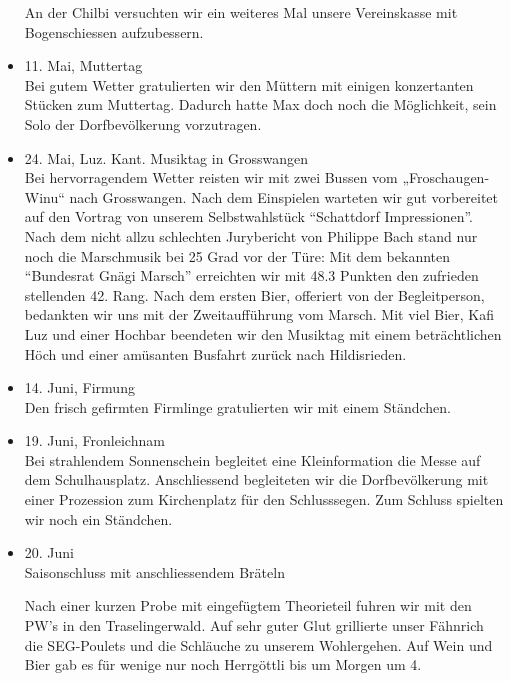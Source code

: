\begin{history}
\begin{itemize}
        An der Chilbi versuchten wir ein weiteres Mal unsere Vereinskasse mit
        Bogenschiessen aufzubessern.

        \item[]11. Mai, Muttertag\\
        Bei gutem Wetter gratulierten wir den Müttern mit einigen konzertanten
        Stücken zum Muttertag. Dadurch hatte Max doch noch die Möglichkeit, sein
        Solo der Dorfbevölkerung vorzutragen.

        \item[]24. Mai, Luz. Kant. Musiktag in Grosswangen\\
        Bei hervorragendem Wetter reisten wir mit zwei Bussen vom „Froschaugen-
        Winu“ nach Grosswangen. Nach dem Einspielen warteten wir gut vorbereitet
        auf den Vortrag von unserem Selbstwahlstück \enquote{Schattdorf
            Impressionen}. Nach dem nicht allzu schlechten Jurybericht von Philippe
        Bach stand nur noch die Marschmusik bei 25 Grad vor der Türe: Mit dem
        bekannten \enquote{Bundesrat Gnägi Marsch} erreichten wir mit 48.3
        Punkten den zufrieden stellenden 42. Rang. Nach dem ersten Bier,
        offeriert von der Begleitperson, bedankten wir uns mit der
        Zweitaufführung vom Marsch. Mit viel Bier, Kafi Luz und einer Hochbar
        beendeten wir den Musiktag mit einem beträchtlichen Höch und einer
        amüsanten Busfahrt zurück nach Hildisrieden.

        \item[]14. Juni,  Firmung\\
        Den frisch gefirmten Firmlinge gratulierten wir mit einem Ständchen.

        \item[]19. Juni, Fronleichnam\\
        Bei strahlendem Sonnenschein begleitet eine Kleinformation die Messe auf
        dem Schulhausplatz. Anschliessend begleiteten wir die Dorfbevölkerung
        mit einer Prozession zum Kirchenplatz für den Schlusssegen. Zum Schluss
        spielten wir noch ein Ständchen.

        \item[]20. Juni\\
        Saisonschluss mit anschliessendem Bräteln

        Nach einer kurzen Probe mit eingefügtem Theorieteil fuhren wir mit den
        PW's in den Traselingerwald. Auf sehr guter Glut grillierte unser
        Fähnrich die SEG-Poulets und die Schläuche zu unserem Wohlergehen. Auf
        Wein und Bier gab es für wenige nur noch Herrgöttli bis um Morgen um 4.


\end{itemize}
\end{history}
